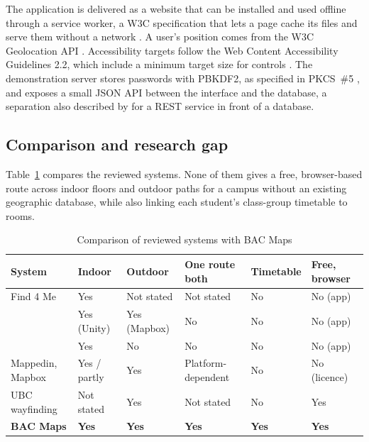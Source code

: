 \documentclass[12pt,a4paper]{report}
\newcommand{\tablespacing}{\singlespacing\small}
\begin{document}
The application is delivered as a website that can be installed and used offline through a service worker, a W3C specification that lets a page cache its files and serve them without a network \citep{w3c2026sw}. A user's position comes from the W3C Geolocation API \citep{w3c2026geo}. Accessibility targets follow the Web Content Accessibility Guidelines 2.2, which include a minimum target size for controls \citep{w3c2024wcag}. The demonstration server stores passwords with PBKDF2, as specified in PKCS~\#5 \citep{rfc8018}, and exposes a small JSON API between the interface and the database, a separation also described by \citet{guntupally2018} for a REST service in front of a database.

\subsection{Comparison and research gap}
Table~\ref{tab:lit} compares the reviewed systems. None of them gives a free, browser-based route across indoor floors and outdoor paths for a campus without an existing geographic database, while also linking each student's class-group timetable to rooms.

\begin{table}[htbp]
\centering\tablespacing
\caption{Comparison of reviewed systems with BAC Maps}\label{tab:lit}
\begin{tabular}{>{\raggedright}p{3.4cm}>{\centering}p{1.6cm}>{\centering}p{1.6cm}>{\centering}p{1.8cm}>{\centering}p{1.9cm}>{\centering\arraybackslash}p{2cm}}
\toprule
System & Indoor & Outdoor & One route both & Timetable & Free, browser \\
\midrule
Find 4 Me \citep{helmi2022} & Yes & Not stated & Not stated & No & No (app) \\
\citet{patel2025} & Yes (Unity) & Yes (Mapbox) & No & No & No (app) \\
\citet{ausmeier2012} & Yes & No & No & No & No (app) \\
Mappedin, Mapbox & Yes / partly & Yes & Platform-dependent & No & No (licence) \\
UBC wayfinding & Not stated & Yes & Not stated & No & Yes \\
\textbf{BAC Maps} & \textbf{Yes} & \textbf{Yes} & \textbf{Yes} & \textbf{Yes} & \textbf{Yes} \\
\bottomrule
\end{tabular}
\end{table}

\end{document}

